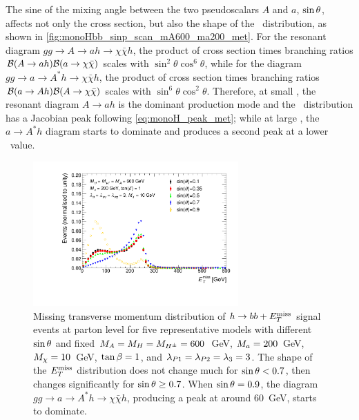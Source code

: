 The sine of the mixing angle between the two pseudoscalars $A$ and $a$, $\sinp$,
affects not only the cross section, but also the shape of the \MET\ distribution, as shown in \autoref{fig:monoHbb_sinp_scan_mA600_ma200_met}. 
For the resonant diagram $gg\rightarrow A \rightarrow ah \rightarrow \chi\bar{\chi}h$, 
the product of cross section times branching ratios 
${\cal B}(A\rightarrow ah){\cal B}(a \rightarrow \chi\bar{\chi})$ 
scales with $\sin^2\theta\cos^6\theta$, while for the diagram 
$gg\rightarrow a \rightarrow A^*h \rightarrow \chi\bar{\chi}h$, the 
product of cross section times branching ratios 
${\cal B}(a\rightarrow Ah){\cal B}(A \rightarrow \chi\bar{\chi})$ 
scales with $\sin^6\theta\cos^2\theta$. Therefore, at small \sinp, the resonant 
diagram $A\rightarrow ah$ is the dominant production mode and the \MET\ distribution 
has a Jacobian peak following \autoref{eq:monoH_peak_met}; while at large \sinp, the 
$a\rightarrow A^*h$ diagram starts to dominate and produces a second peak at a lower 
\MET\ value.


\begin{figure}[tbp]
\centering
\includegraphics[width=0.7\textwidth]{texinputs/04_grid/figures/monoHbb_sinp_scan_MA600_Ma200_MET_liny_norm2one.pdf}
\caption[$\MET$ distribution in $h\rightarrow bb + \MET$ events for different 
$\sinp$ for $\mA = \mH = \mHc = 600 $ GeV and $\ma = 200$ GeV]
{
Missing transverse momentum distribution of $h\rightarrow bb + \MET$ signal 
events at parton level for five representative models with different $\sinp$ and
 fixed $\mA = \mH = \mHc = 600 $~GeV, $\ma = 200$~GeV, $ M_{\chi} = 10$~GeV, $\tan\beta = 1$, 
and $ \lambda_{P1} = \lambda_{P2} = \lambda_{3} = 3 $. 
The shape of the $\MET$ distribution does not change much  
for $\sin\theta < 0.7$, then changes significantly for $\sin\theta\geq 0.7$. 
When $\sin\theta=0.9$, the diagram $gg\rightarrow a\rightarrow A^*h \rightarrow \chi \bar{\chi} h$, 
producing a \MET peak at around 60~GeV, starts to dominate.
%
}
\label{fig:monoHbb_sinp_scan_mA600_ma200_met}
\end{figure}



